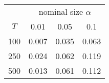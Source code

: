 % 
\begin{tabular}{cccc}
  \hline
  & \multicolumn{3}{c}{nominal size $\alpha$} \\
 $T$ & 0.01 & 0.05 & 0.1 \\
 \hline
100 & 0.007 & 0.035 & 0.063 \\ 
  250 & 0.024 & 0.062 & 0.119 \\ 
  500 & 0.013 & 0.061 & 0.112 \\ 
   \hline
\end{tabular}
